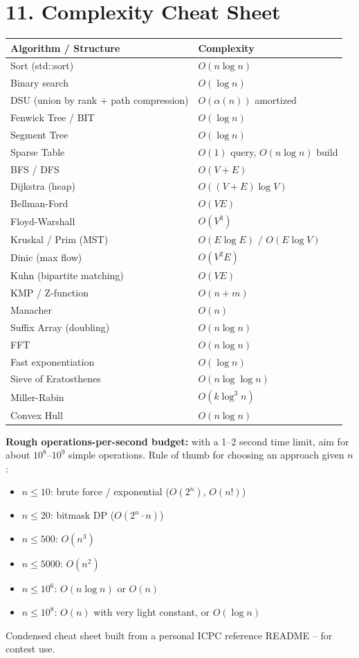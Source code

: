 \documentclass[11pt]{extarticle}
\begin{document}
\section*{11. Complexity Cheat Sheet}
\begin{center}
\renewcommand{\arraystretch}{1.3}
\begin{tabular}{|l|l|}
\hline
\textbf{Algorithm / Structure} & \textbf{Complexity} \\
\hline
Sort (std::sort) & $O(n \log n)$ \\
Binary search & $O(\log n)$ \\
DSU (union by rank + path compression) & $O(\alpha(n))$ amortized \\
Fenwick Tree / BIT & $O(\log n)$ \\
Segment Tree & $O(\log n)$ \\
Sparse Table & $O(1)$ query, $O(n\log n)$ build \\
BFS / DFS & $O(V+E)$ \\
Dijkstra (heap) & $O((V+E)\log V)$ \\
Bellman-Ford & $O(VE)$ \\
Floyd-Warshall & $O(V^3)$ \\
Kruskal / Prim (MST) & $O(E \log E)$ / $O(E \log V)$ \\
Dinic (max flow) & $O(V^2E)$ \\
Kuhn (bipartite matching) & $O(VE)$ \\
KMP / Z-function & $O(n+m)$ \\
Manacher & $O(n)$ \\
Suffix Array (doubling) & $O(n \log n)$ \\
FFT & $O(n \log n)$ \\
Fast exponentiation & $O(\log n)$ \\
Sieve of Eratosthenes & $O(n \log \log n)$ \\
Miller-Rabin & $O(k \log^3 n)$ \\
Convex Hull & $O(n \log n)$ \\
\hline
\end{tabular}
\end{center}

\textbf{Rough operations-per-second budget:} with a 1--2 second time
limit, aim for about $10^8$--$10^9$ simple operations. Rule of thumb
for choosing an approach given $n$:
\begin{itemize}[leftmargin=1.2em,itemsep=1pt,topsep=3pt]
\item $n \le 10$: brute force / exponential ($O(2^n)$, $O(n!)$)
\item $n \le 20$: bitmask DP ($O(2^n \cdot n)$)
\item $n \le 500$: $O(n^3)$
\item $n \le 5000$: $O(n^2)$
\item $n \le 10^6$: $O(n \log n)$ or $O(n)$
\item $n \le 10^8$: $O(n)$ with very light constant, or $O(\log n)$
\end{itemize}

\vspace{10pt}
\begin{center}\small
Condensed cheat sheet built from a personal ICPC reference README --
for contest use.
\end{center}
\end{document}
